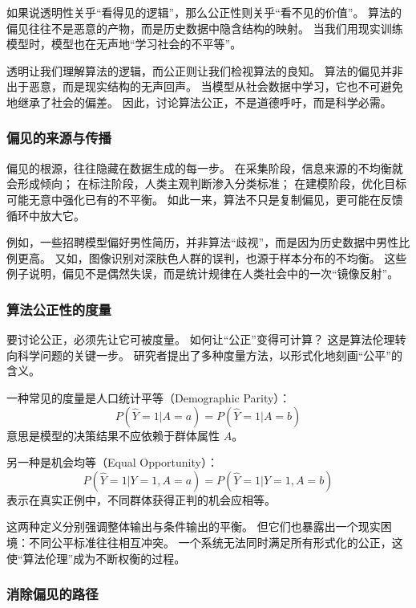 如果说透明性关乎“看得见的逻辑”，那么公正性则关乎“看不见的价值”。  
算法的偏见往往不是恶意的产物，而是历史数据中隐含结构的映射。  
当我们用现实训练模型时，模型也在无声地“学习社会的不平等”。  

透明让我们理解算法的逻辑，而公正则让我们检视算法的良知。  
算法的偏见并非出于恶意，而是现实结构的无声回声。  
当模型从社会数据中学习，它也不可避免地继承了社会的偏差。  
因此，讨论算法公正，不是道德呼吁，而是科学必需。

\subsubsection{偏见的来源与传播}

偏见的根源，往往隐藏在数据生成的每一步。  
在采集阶段，信息来源的不均衡就会形成倾向；  
在标注阶段，人类主观判断渗入分类标准；  
在建模阶段，优化目标可能无意中强化已有的不平衡。  
如此一来，算法不只是复制偏见，更可能在反馈循环中放大它。

例如，一些招聘模型偏好男性简历，并非算法“歧视”，而是因为历史数据中男性比例更高。  
又如，图像识别对深肤色人群的误判，也源于样本分布的不均衡。  
这些例子说明，偏见不是偶然失误，而是统计规律在人类社会中的一次“镜像反射”。

\subsubsection{算法公正性的度量}
要讨论公正，必须先让它可被度量。  
如何让“公正”变得可计算？  
这是算法伦理转向科学问题的关键一步。  
研究者提出了多种度量方法，以形式化地刻画“公平”的含义。  

一种常见的度量是人口统计平等（Demographic Parity）：  
\begin{equation}
P(\hat{Y}=1|A=a) = P(\hat{Y}=1|A=b)
\end{equation}
意思是模型的决策结果不应依赖于群体属性 $A$。  

另一种是机会均等（Equal Opportunity）：  
\begin{equation}
P(\hat{Y}=1|Y=1, A=a) = P(\hat{Y}=1|Y=1, A=b)
\end{equation}
表示在真实正例中，不同群体获得正判的机会应相等。  

这两种定义分别强调整体输出与条件输出的平衡。  
但它们也暴露出一个现实困境：不同公平标准往往相互冲突。  
一个系统无法同时满足所有形式化的公正，这使“算法伦理”成为不断权衡的过程。

\subsubsection{消除偏见的路径}

